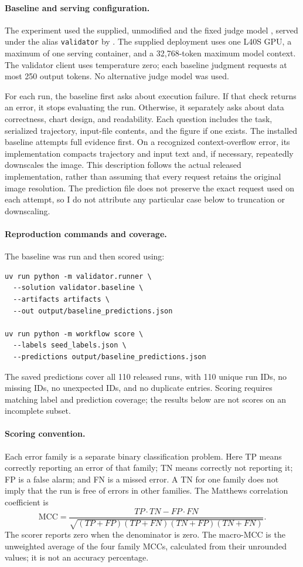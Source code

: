 \documentclass[11pt]{article}
\begin{document}
\paragraph{Baseline and serving configuration.}
The experiment used the supplied, unmodified 
and the fixed judge model
, served under the alias
\texttt{validator} by .
The supplied deployment uses one L40S GPU, a maximum of one serving container,
and a 32,768-token maximum model context. The validator client uses
temperature zero; each baseline judgment requests at most 250 output tokens.
No alternative judge model was used.

For each run, the baseline first asks about execution failure. If that check
returns an error, it stops evaluating the run. Otherwise, it separately asks
about data correctness, chart design, and readability. Each question includes
the task, serialized trajectory, input-file contents, and the figure if one
exists. The installed baseline attempts full evidence first. On a recognized
context-overflow error, its implementation compacts trajectory and input text
and, if necessary, repeatedly downscales the image. This description follows
the actual released implementation, rather than assuming that every request
retains the original image resolution. The prediction file does not preserve
the exact request used on each attempt, so I do not attribute any particular
case below to truncation or downscaling.

\paragraph{Reproduction commands and coverage.}
The baseline was run and then scored using:
\begin{verbatim}
uv run python -m validator.runner \
  --solution validator.baseline \
  --artifacts artifacts \
  --out output/baseline_predictions.json

uv run python -m workflow score \
  --labels seed_labels.json \
  --predictions output/baseline_predictions.json
\end{verbatim}
The saved predictions cover all 110 released runs, with 110 unique run IDs,
no missing IDs, no unexpected IDs, and no duplicate entries.
Scoring requires matching label and prediction coverage; the results below
are not scores on an incomplete subset.

\paragraph{Scoring convention.}
Each error family is a separate binary classification problem. Here TP means
correctly reporting an error of that family; TN means correctly not reporting
it; FP is a false alarm; and FN is a missed error. A TN for one family does not
imply that the run is free of errors in other families.
The Matthews correlation coefficient is
\[
 \mathrm{MCC}
 =
 \frac{TP\cdot TN-FP\cdot FN}
 {\sqrt{(TP+FP)(TP+FN)(TN+FP)(TN+FN)}}.
\]
The scorer reports zero when the denominator is zero.
The macro-MCC is the unweighted average of the four family MCCs, calculated
from their unrounded values; it is not an accuracy percentage.
\end{document}
